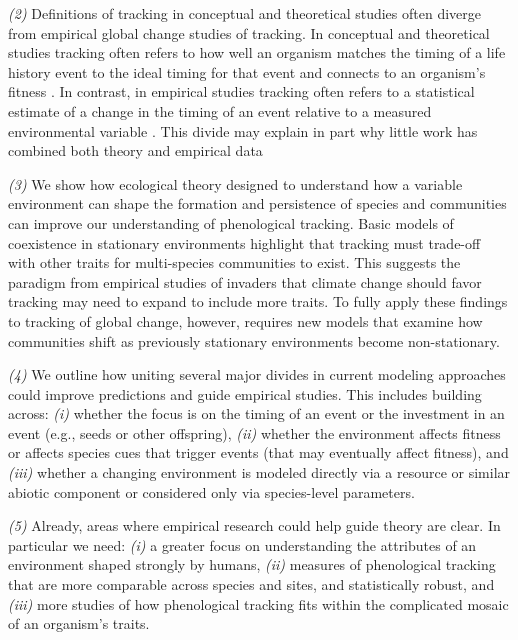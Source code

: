 \documentclass[11pt,letterpaper]{article}
\begin{document}
\emph{(2)} Definitions of tracking in conceptual and theoretical studies often diverge from empirical global change studies of tracking. In conceptual and theoretical studies tracking often refers to how well an organism matches the timing of a life history event to the ideal timing for that event and connects to an organism's fitness \citep{vissergienapp2019}. In contrast, in empirical studies tracking often refers to a statistical estimate of a change in the timing of an event relative to a measured environmental variable \citep[such as temperature or precipitation,][]{chmura2019}. This divide may explain in part why little work has combined both theory and empirical data

\emph{(3)} We show how ecological theory designed to understand how a variable environment can shape the formation and persistence of species and communities can improve our understanding of phenological tracking.  Basic models of coexistence in stationary environments highlight that tracking must trade-off with other traits for multi-species communities to exist. This suggests the paradigm from empirical studies of invaders that climate change should favor tracking may need to expand to include more traits. To fully apply these findings to tracking of global change, however, requires new models that examine how communities shift as previously stationary environments become non-stationary.

\emph{(4)}  We outline how uniting several major divides in current modeling approaches could improve predictions and guide empirical studies. This includes building across: \emph{(i)} whether the focus is on the timing of an event or the investment in an event (e.g., seeds or other offspring), \emph{(ii)} whether the environment affects fitness or affects species cues that trigger events (that may eventually affect fitness), and \emph{(iii)} whether a changing environment is modeled directly via a resource or similar abiotic component or considered only via species-level parameters. 

\emph{(5)} Already, areas where empirical research could help guide theory are clear. In particular we need: \emph{(i)} a greater focus on understanding the attributes of an environment shaped strongly by humans, \emph{(ii)} measures of phenological tracking that are more comparable across species and sites, and statistically robust, and \emph{(iii)} more studies of how phenological tracking fits within the complicated mosaic of an organism's traits.
\end{document}
